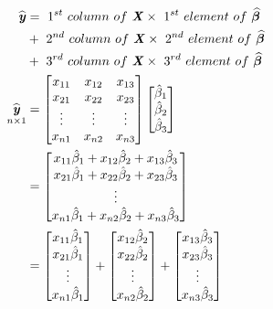 \documentclass[12pt]{report}
\begin{document}
\begin{align*}
\widehat{\textbf{\textit{y}}} &=\ 1^{st}\ column\ of\ \textbf{\textit{X}} \times\ 1^{st}\ element\ of\ \widehat{\boldsymbol{\beta}} \\
&+\ 2^{nd}\ column\ of\ \textbf{\textit{X}} \times\ 2^{nd}\ element\ of\ \widehat{\boldsymbol{\beta}}\\
&+\ 3^{rd}\ column\ of\ \textbf{\textit{X}} \times\ 3^{rd}\ element\ of\ \widehat{\boldsymbol{\beta}} \\
\underset{n\times1}{\widehat{\textbf{\textit{y}}}}
&=
\begin{bmatrix}
x_{11} & x_{12} & x_{13} \\
x_{21} & x_{22} & x_{23} \\
\vdots & \vdots & \vdots \\
x_{n1} & x_{n2} & x_{n3} 
\end{bmatrix}
\begin{bmatrix}
\hat{\beta}_1 \\
\hat{\beta}_2 \\
\hat{\beta}_3 
\end{bmatrix} \\
&=
\begin{bmatrix}
x_{11}\hat{\beta}_1+x_{12}\hat{\beta}_2+	x_{13}\hat{\beta}_3 \\
x_{21}\hat{\beta}_1+x_{22}\hat{\beta}_2+	x_{23}\hat{\beta}_3 \\
\vdots \\
x_{n1}\hat{\beta}_1+x_{n2}\hat{\beta}_2+	x_{n3}\hat{\beta}_3 
\end{bmatrix} \\
&=
\begin{bmatrix}
x_{11}\hat{\beta}_1 \\
x_{21}\hat{\beta}_1 \\
\vdots \\
x_{n1}\hat{\beta}_1 
\end{bmatrix}
+
\begin{bmatrix}
x_{12}\hat{\beta}_2 \\
x_{22}\hat{\beta}_2 \\
\vdots \\
x_{n2}\hat{\beta}_2 
\end{bmatrix}
+
\begin{bmatrix}
x_{13}\hat{\beta}_3 \\
x_{23}\hat{\beta}_3 \\
\vdots \\
x_{n3}\hat{\beta}_3 
\end{bmatrix} \\

\end{align*}
\end{document}
